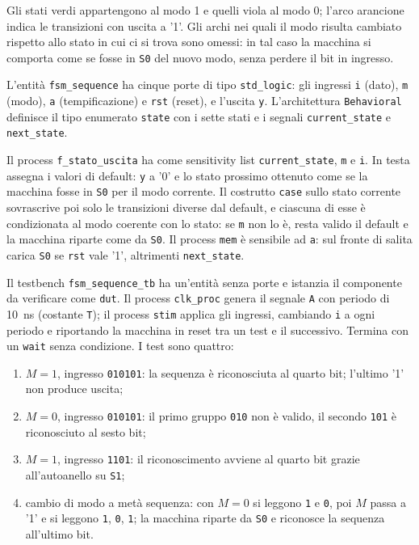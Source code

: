 Gli stati verdi appartengono al modo 1 e quelli viola al modo 0; l'arco arancione indica le transizioni con uscita a '1'. Gli archi nei quali il modo risulta cambiato rispetto allo stato in cui ci si trova sono omessi: in tal caso la macchina si comporta come se fosse in \texttt{S0} del nuovo modo, senza perdere il bit in ingresso.

\implementazione

L'entità \texttt{fsm\_sequence} ha cinque porte di tipo \texttt{std\_logic}: gli ingressi \texttt{i} (dato), \texttt{m} (modo), \texttt{a} (tempificazione) e \texttt{rst} (reset), e l'uscita \texttt{y}. L'architettura \texttt{Behavioral} definisce il tipo enumerato \texttt{state} con i sette stati e i segnali \texttt{current\_state} e \texttt{next\_state}.

Il process \texttt{f\_stato\_uscita} ha come sensitivity list \texttt{current\_state}, \texttt{m} e \texttt{i}. In testa assegna i valori di default: \texttt{y} a '0' e lo stato prossimo ottenuto come se la macchina fosse in \texttt{S0} per il modo corrente. Il costrutto \texttt{case} sullo stato corrente sovrascrive poi solo le transizioni diverse dal default, e ciascuna di esse è condizionata al modo coerente con lo stato: se \texttt{m} non lo è, resta valido il default e la macchina riparte come da \texttt{S0}. Il process \texttt{mem} è sensibile ad \texttt{a}: sul fronte di salita carica \texttt{S0} se \texttt{rst} vale '1', altrimenti \texttt{next\_state}.


\simulazione

Il testbench \texttt{fsm\_sequence\_tb} ha un'entità senza porte e istanzia il componente da verificare come \texttt{dut}. Il process \texttt{clk\_proc} genera il segnale \texttt{A} con periodo di \SI{10}{\nano\second} (costante \texttt{T}); il process \texttt{stim} applica gli ingressi, cambiando \texttt{i} a ogni periodo e riportando la macchina in reset tra un test e il successivo. Termina con un \texttt{wait} senza condizione. I test sono quattro:
\begin{enumerate}
  \item $M=1$, ingresso \texttt{010101}: la sequenza è riconosciuta al quarto bit; l'ultimo '1' non produce uscita;
  \item $M=0$, ingresso \texttt{010101}: il primo gruppo \texttt{010} non è valido, il secondo \texttt{101} è riconosciuto al sesto bit;
  \item $M=1$, ingresso \texttt{1101}: il riconoscimento avviene al quarto bit grazie all'autoanello su \texttt{S1};
  \item cambio di modo a metà sequenza: con $M=0$ si leggono \texttt{1} e \texttt{0}, poi $M$ passa a '1' e si leggono \texttt{1}, \texttt{0}, \texttt{1}; la macchina riparte da \texttt{S0} e riconosce la sequenza all'ultimo bit.
\end{enumerate}

